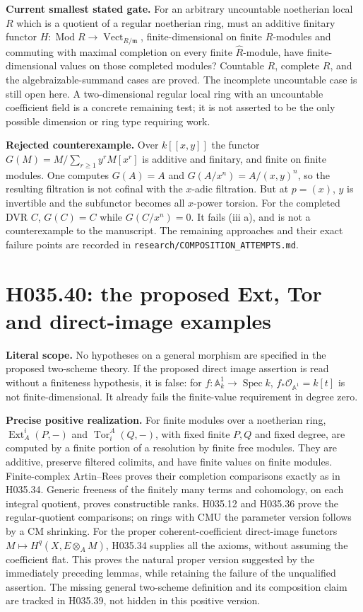\textbf{Current smallest stated gate.} For an arbitrary uncountable
noetherian local $R$ which is a quotient of a regular noetherian ring,
must an additive finitary functor
$H:\operatorname{Mod}R\to\operatorname{Vect}_{R/\mathfrak m}$,
finite-dimensional on finite $R$-modules and commuting with maximal
completion on every finite $\widehat R$-module, have finite-dimensional
values on those completed modules? Countable $R$, complete $R$, and
the algebraizable-summand cases are proved. The incomplete uncountable
case is still open here. A two-dimensional regular local ring with an
uncountable coefficient field is a concrete remaining test; it is not
asserted to be the only possible dimension or ring type requiring work.

\textbf{Rejected counterexample.} Over $k[[x,y]]$ the functor
$G(M)=M/\sum_{r\geq1}y^rM[x^r]$ is additive and finitary, and
finite on finite modules. One computes $G(A)=A$ and
$G(A/x^n)=A/(x,y)^n$, so the resulting filtration is not
cofinal with the $x$-adic filtration. But at $p=(x)$, $y$ is
invertible and the subfunctor becomes all $x$-power torsion.
For the completed DVR $C$, $G(C)=C$ while $G(C/x^n)=0$.
It fails (iii a), and is not a counterexample to the manuscript.
The remaining approaches and their exact failure points are
recorded in \texttt{research/COMPOSITION\_ATTEMPTS.md}.

\section{H035.40: the proposed Ext, Tor and direct-image examples}
\textbf{Literal scope.} No hypotheses on a general morphism are
specified in the proposed two-scheme theory. If the proposed direct
image assertion is read without a finiteness hypothesis, it is false:
for $f:\mathbb A^1_k\to\operatorname{Spec}k$,
$f_*\mathcal O_{\mathbb A^1}=k[t]$ is not finite-dimensional.
It already fails the finite-value requirement in degree zero.

\textbf{Precise positive realization.} For finite modules over a
noetherian ring, $\operatorname{Ext}^i_A(P,-)$ and
$\operatorname{Tor}_i^A(Q,-)$, with fixed finite $P,Q$ and fixed
degree, are computed by a finite portion of a resolution by finite
free modules. They are additive, preserve filtered colimits, and
have finite values on finite modules. Finite-complex Artin--Rees
proves their completion comparisons exactly as in H035.34.
Generic freeness of the finitely many terms and cohomology, on
each integral quotient, proves constructible ranks. H035.12
and H035.36 prove the regular-quotient comparisons; on rings
with CMU the parameter version follows by a CM shrinking.
For the proper coherent-coefficient direct-image functors
$M\mapsto H^q(X,E\otimes_A M)$, H035.34 supplies all the
axioms, without assuming the coefficient flat. This proves the
natural proper version suggested by the immediately preceding
lemmas, while retaining the failure of the unqualified assertion.
The missing general two-scheme definition and its composition
claim are tracked in H035.39, not hidden in this positive version.

